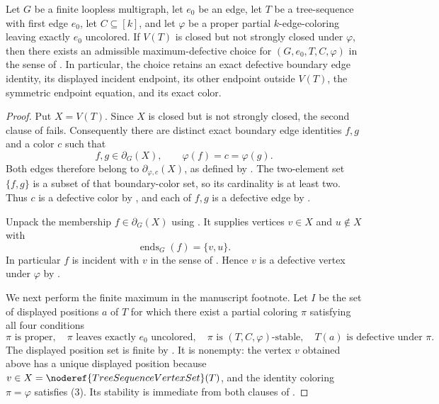 \begin{lemma}
Let \(G\) be a finite loopless multigraph, let \(e_0\) be an edge, let
\(T\) be a tree-sequence with first edge \(e_0\), let
\(C\subseteq [k]\), and let \(\varphi\) be a proper partial
\(k\)-edge-coloring leaving exactly \(e_0\) uncolored.  If \(V(T)\) is
closed but not strongly closed under \(\varphi\), then there exists an
admissible maximum-defective choice for
\((G,e_0,T,C,\varphi)\) in the sense of
.  In particular, the choice retains an
exact defective boundary edge identity, its displayed incident endpoint,
its other endpoint outside \(V(T)\), the symmetric endpoint equation, and
its exact color.
\end{lemma}
\begin{proof}
Put \(X=V(T)\).  Since \(X\) is closed but is not strongly closed,
the second clause of  fails.
Consequently there are distinct exact boundary edge identities \(f,g\)
and a color \(c\) such that
\[
 f,g\in\partial_G(X),\qquad \varphi(f)=c=\varphi(g).             \tag{1}
\]
Both edges therefore belong to
\(\partial_{\varphi,c}(X)\), as defined by
.  The two-element set \(\{f,g\}\) is a
subset of that boundary-color set, so its cardinality is at least two.
Thus \(c\) is a defective color by , and each of
\(f,g\) is a defective edge by .

Unpack the membership \(f\in\partial_G(X)\) using
.  It supplies vertices \(v\in X\) and
\(u\notin X\) with
\[
                         \operatorname{ends}_G(f)=\{v,u\}.       \tag{2}
\]
In particular \(f\) is incident with \(v\) in the sense of
.  Hence \(v\) is a defective vertex under
\(\varphi\) by .

We next perform the finite maximum in the manuscript footnote.  Let
\(I\) be the set of displayed positions \(a\) of \(T\) for which there
exist a partial coloring \(\pi\) satisfying all four conditions
\[
 \pi\text{ is proper},\quad \pi\text{ leaves exactly }e_0
 \text{ uncolored},\quad
 \pi\text{ is }(T,C,\varphi)\text{-stable},\quad
 T(a)\text{ is defective under }\pi.                            \tag{3}
\]
The displayed position set is finite by .  It is
nonempty: the vertex \(v\) obtained above has a unique displayed position
because \(v\in X=\noderef{TreeSequenceVertexSet}(T)\), and the identity
coloring \(\pi=\varphi\) satisfies (3).  Its stability is immediate from
both clauses of .


\end{proof}
